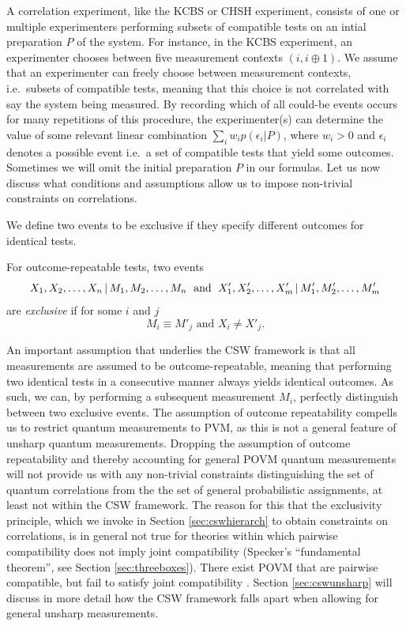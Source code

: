 A correlation experiment, like the KCBS or CHSH experiment, consists of one or multiple experimenters performing subsets of compatible tests on an intial preparation $P$ of the system. For instance, in the KCBS experiment, an experimenter chooses between five measurement contexts $(i,i\oplus 1)$. We assume that an experimenter can freely choose between measurement contexts, i.e.\ subsets of compatible tests, meaning that this choice is not correlated with say the system being measured. By recording which of all could-be events occurs for many repetitions of this procedure, the experimenter(s) can determine the value of some relevant linear combination $\sum_i w_i p(\epsilon_i\vert P)$, where $w_i>0$ and $\epsilon_i$ denotes a possible event i.e.\ a set of compatible tests that yield some outcomes. Sometimes we will omit the initial preparation $P$ in our formulas. Let us now discuss what conditions and assumptions allow us to impose non-trivial constraints on correlations.

We define two events to be exclusive if they specify different outcomes for identical tests.
\begin{definition}
\label{def:exclevents}
For outcome-repeatable tests, two events
\begin{equation*}
X_1,X_2,\dots, X_n\thinspace\vert\thinspace M_1,M_2,\dots, M_n\;\text{ and }\; X'_1,X'_2,\dots, X'_m\thinspace\vert\thinspace M'_1,M'_2,\dots, M'_m  
\end{equation*} are \emph{exclusive} if for some $i$ and $j$
\begin{equation*}
    M_i \equiv M'_j \text{ and } X_i \neq X'_j.
\end{equation*}
\end{definition}

An important assumption that underlies the CSW framework is that all measurements are assumed to be outcome-repeatable, meaning that performing two identical tests in a consecutive manner always yields identical outcomes. As such, we can, by performing a subsequent measurement $M_i$, perfectly distinguish between two exclusive events. The assumption of outcome repeatability compells us to restrict quantum measurements to PVM, as this is not a general feature of unsharp quantum measurements. Dropping the assumption of outcome repeatability and thereby accounting for general POVM quantum measurements will not provide us with any non-trivial constraints distinguishing the set of quantum correlations from the the set of general probabilistic assignments, at least not within the CSW framework. The reason for this that the exclusivity principle, which we invoke in Section \ref{sec:cswhierarch} to obtain constraints on correlations, is in general not true for theories within which pairwise compatibility does not imply joint compatibility (Specker's ``fundamental theorem'', see Section \ref{sec:threeboxes}). There exist POVM that are pairwise compatible, but fail to satisfy joint compatibility \cite{Heunen2014}. Section \ref{sec:cswunsharp} will discuss in more detail how the CSW framework falls apart when allowing for general unsharp measurements.

